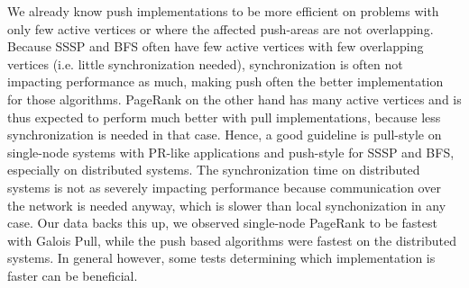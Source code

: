 
We already know push implementations to be more efficient on problems with only few active vertices or where the affected push-areas are not overlapping. 
Because SSSP and BFS often have few active vertices with few overlapping vertices (i.e. little synchronization needed), synchronization is often not impacting performance as much, making push often the better implementation for those algorithms.
PageRank on the other hand has many active vertices and is thus expected to perform much better with pull implementations, because less synchronization is needed in that case.
Hence, a good guideline is pull-style on single-node systems with PR-like applications and push-style for SSSP and BFS, especially on distributed systems.
The synchronization time on distributed systems is not as severely impacting performance because communication over the network is needed anyway, which is slower than local synchonization in any case.
Our data backs this up, we observed single-node PageRank to be fastest with Galois Pull, while the push based algorithms were fastest on the distributed systems.
In general however, some tests determining which implementation is faster can be beneficial.





